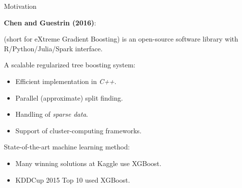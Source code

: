 











\begin{vbframe}{Motivation}

\textbf{Chen and Guestrin (2016)}:

 (short for eXtreme Gradient Boosting) is an open-source software
library with R/Python/Julia/Spark interface.

\lz

A scalable regularized tree boosting system:
\begin{itemize}
  \item Efficient implementation in \emph{C++}.
  \item Parallel (approximate) split finding.
  \item Handling of \emph{sparse data}.
  \item Support of cluster-computing frameworks.
\end{itemize}

\lz

State-of-the-art machine learning method:
\begin{itemize}
  \item Many winning solutions at Kaggle use XGBoost.
  \item KDDCup 2015 Top 10 used XGBoost.
\end{itemize}

\end{vbframe}


